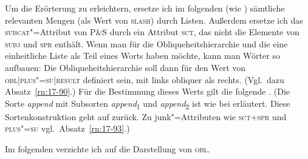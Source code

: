 \documentclass[output=paper]{LSP/langsci}
\begin{document}
\randnum\label{rn:17-35}Um die Erörterung zu erleichtern, ersetze ich im folgenden (wie
\citealt{pollard1993a}) sämtliche relevanten Mengen (\zb als Wert von \textsc{slash})
durch Listen. Außerdem ersetze ich das \textsc{subcat}"=Attribut von P\&S durch
ein Attribut \textsc{sct}, das nicht die Elemente von \textsc{subj} und \textsc{spr} enthält. Wenn man für die Obliqueheitshierarchie und die  eine
einheitliche Liste als Teil eines Worts haben möchte, kann man Wörter
so aufbauen:
\ea
{}
\z
\randnum\label{rn:17-36}Die Obliqueheitshierarchie soll dann für den Wert von
\textsc{obl|plus"=su|result} definiert sein, mit links obliquer als
rechts. (Vgl.\ dazu Absatz~\ref{rn:17-90}.) Für die Bestimmung dieses Werts gilt die
folgende . (Die Sorte \textit{append} mit Subsorten
\textit{append}\textsubscript{1} und \textit{append}\textsubscript{2}
ist wie bei \citet[240]{Carpenter92a} erläutert. Diese Sortenkonstruktion geht
auf \citet[118]{ait-kaci1984a} zurück. Zu {\glqq}junk{\grqq}"=Attributen wie \textsc{sct}+\textsc{spr} und \textsc{plus"=su} vgl.\ Absatz~\ref{rn:17-93}.)
\begin{exe}
\ex
{}
\end{exe}
Im folgenden verzichte ich auf die Darstellung von \textsc{obl}.
\end{document}
